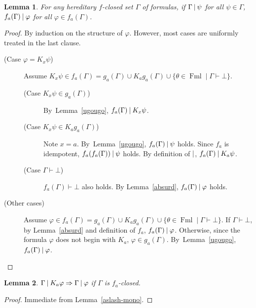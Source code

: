 \documentclass[doctor]{iscs-thesis}
\newcommand{\fml}{\operatorname{Fml}}
\newtheorem{lemma}{Lemma}
\begin{document}
\begin{lemma}
 For any hereditary $f$-closed set $\Gamma$ of formulas,
 if $\Gamma\mathbin{\mid} \psi$ for all $\psi\in\Gamma$,
 $f_a(\Gamma)\mathbin{\mid} \varphi$ for all $\varphi \in f_a(\Gamma)$.
\end{lemma}
\begin{proof}
  By induction on the structure of $\varphi$. However, most cases are uniformly treated in
 the last clause.
 \begin{description}
  \item[ (Case $\varphi = K_x\psi$)]
	     Assume $K_x\psi\in f_a(\Gamma) = g_a(\Gamma)\cup K_ag_a(\Gamma)\cup
	     \{\theta\in\fml\mid\Gamma\vdash\bot\}$.
	     \begin{description}
	      \item[ (Case $K_x\psi\in g_a(\Gamma)$)]
			 By~Lemma~\ref{ugougo}, $f_a(\Gamma)\mathbin{\mid} K_x\psi$.
	      \item[ (Case $K_x\psi\in K_ag_a(\Gamma)$)]
			 Note $x = a$.
			 By~Lemma~\ref{ugougo},
			 $f_a(\Gamma)\mathbin{\mid}\psi$ holds.
			 Since $f_a$ is idempotent,
			 $f_a(f_a(\Gamma))\mathbin{\mid}\psi$ holds.
			 By definition of $\mathbin{\mid}$,
			 $f_a(\Gamma)\mathbin{\mid} K_a\psi$.
	      \item[ (Case $\Gamma\vdash\bot$)]
			 $f_a(\Gamma)\vdash\bot$ also holds.
			 By Lemma~\ref{absurd}, $f_a(\Gamma)\mathbin{\mid}\varphi$ holds.
	     \end{description}
  \item[ (Other cases)] 
	     Assume $\varphi\in f_a(\Gamma) = g_a(\Gamma)\cup K_ag_a(\Gamma)\cup
	     \{\theta\in\fml\mid\Gamma\vdash\bot\}$.
	     If $\Gamma\vdash\bot$, by Lemma~\ref{absurd} and definition of $f_a$,
	     $f_a(\Gamma)\mathbin{\mid}\varphi$.
	     Otherwise, since the formula $\varphi$ does not begin with $K_a$,
	     $\varphi\in g_a(\Gamma)$.
	     By~Lemma~\ref{ugougo}, $f_a(\Gamma)\mathbin{\mid}\varphi$.
 \end{description}
\end{proof}


\begin{lemma}
 \label{T}
 $\Gamma\mathbin{\mid} K_a\varphi\Rightarrow \Gamma\mathbin{\mid}\varphi$ if $\Gamma$ is $f_a$-closed.
\end{lemma}
\begin{proof}
 Immediate from Lemma~\ref{aslash-mono}.
\end{proof}
\end{document}
